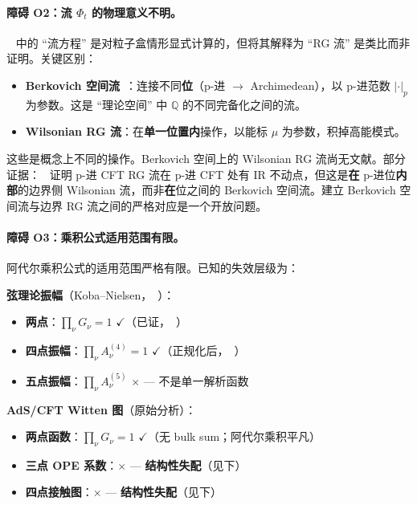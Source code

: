 \documentclass[11pt,a4paper]{ctexart}
\theoremstyle{remark}
\newcommand{\Q}{\mathbb{Q}}
\begin{document}
\paragraph{障碍 O2：流 $\Phi_t$ 的物理意义不明。}
~\cite{HMS20} 中的 ``流方程'' 是对粒子盒情形显式计算的，但将其解释为 ``RG 流'' 是类比而非证明。关键区别：
\begin{itemize}[leftmargin=2em]
    \item \textbf{Berkovich 空间流}~\cite{HMS20}：连接不同\textbf{位}（p-进 $\to$ Archimedean），以 p-进范数 $|\cdot|_p$ 为参数。这是 ``理论空间'' 中 $\Q$ 的不同完备化之间的流。
    \item \textbf{Wilsonian RG 流}：在\textbf{单一位置内}操作，以能标 $\mu$ 为参数，积掉高能模式。
\end{itemize}
这些是概念上不同的操作。Berkovich 空间上的 Wilsonian RG 流尚无文献。部分证据：~\cite{HLM19} 证明 p-进 CFT RG 流在 p-进 CFT 处有 IR 不动点，但这是\textbf{在} p-进位\textbf{内部}的边界侧 Wilsonian 流，而非\textbf{在}位之间的 Berkovich 空间流。建立 Berkovich 空间流与边界 RG 流之间的严格对应是一个开放问题。

\paragraph{障碍 O3：乘积公式适用范围有限。}
阿代尔乘积公式的适用范围严格有限。已知的失效层级为：

\textbf{弦理论振幅}（Koba--Nielsen，~\cite{J22}）：
\begin{itemize}[leftmargin=2em]
    \item \textbf{两点}：$\prod_\nu G_\nu = 1$ $\checkmark$（已证，~\cite{HSYZ20}）
    \item \textbf{四点振幅}：$\prod_\nu A^{(4)}_\nu = 1$ $\checkmark$（正规化后，~\cite{J22}）
    \item \textbf{五点振幅}：$\prod_\nu A^{(5)}_\nu$ $\times$ --- 不是单一解析函数~\cite{J22}
\end{itemize}

\textbf{AdS/CFT Witten 图}（原始分析）：
\begin{itemize}[leftmargin=2em]
    \item \textbf{两点函数}：$\prod_\nu G_\nu = 1$ $\checkmark$（无 bulk sum；阿代尔乘积平凡）
    \item \textbf{三点 OPE 系数}：$\times$ --- \textbf{结构性失配}（见下）
    \item \textbf{四点接触图}：$\times$ --- \textbf{结构性失配}（见下）
\end{itemize}
\end{document}
